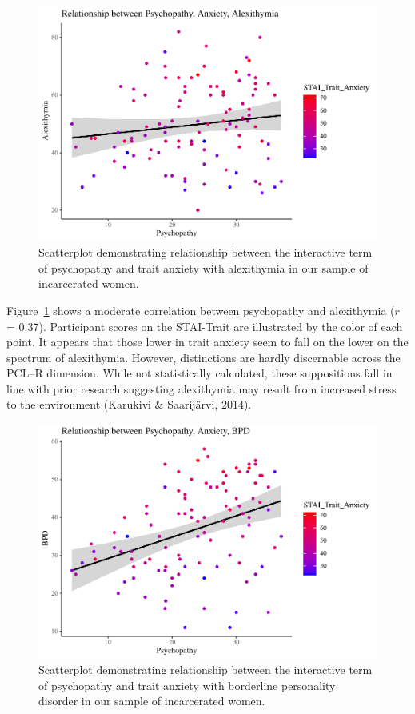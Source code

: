 \documentclass[
  man,floatsintext]{apa7}
\begin{document}
\begin{figure}
\includegraphics[width=1\linewidth]{d2m-Psychopathy_files/figure-latex/c-path-scatterplot-1} \caption{Scatterplot demonstrating relationship between the interactive term of psychopathy and trait anxiety with alexithymia in our sample of incarcerated women.}\label{fig:c-path-scatterplot}
\end{figure}

Figure~\ref{fig:c-path-scatterplot} shows a moderate correlation between psychopathy and alexithymia (\(r\) = 0.37). Participant scores on the STAI-Trait are illustrated by the color of each point. It appears that those lower in trait anxiety seem to fall on the lower on the spectrum of alexithymia. However, distinctions are hardly discernable across the PCL--R dimension. While not statistically calculated, these suppositions fall in line with prior research suggesting alexithymia may result from increased stress to the environment (Karukivi \& Saarijärvi, 2014).



\begin{figure}
\includegraphics[width=1\linewidth]{d2m-Psychopathy_files/figure-latex/a-path-scatterplot-1} \caption{Scatterplot demonstrating relationship between the interactive term of psychopathy and trait anxiety with borderline personality disorder in our sample of incarcerated women.}\label{fig:a-path-scatterplot}
\end{figure}
\end{document}
